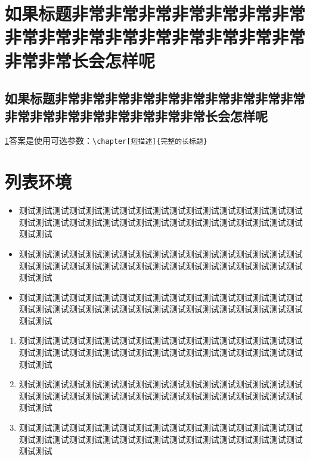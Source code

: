 \documentclass{njuthesis}
\begin{document}
\maketitle

% 


\raggedbottom

\tableofcontents
\listoffigures
\listoftables

\mainmatter

\chapter[非常长的标题不好看]{如果标题非常非常非常非常非常非常非常非常非常非常非常非常非常非常非常非常非常非常长会怎样呢}
\label{ch:longtitle}
\section[还是用短点的吧]{如果标题非常非常非常非常非常非常非常非常非常非常非常非常非常非常非常非常非常非常长会怎样呢}
\cref{ch:longtitle}答案是使用可选参数：\verb+\chapter[短描述]{完整的长标题}+

\zhlipsum[1-10][name=zhufu]

\chapter{列表环境}

\begin{itemize}
    \item 测试测试测试测试测试测试测试测试测试测试测试测试测试测试测试测试测试测试测试测试测试测试测试测试测试测试测试测试测试测试测试测试测试测试测试测试
    \item 测试测试测试测试测试测试测试测试测试测试测试测试测试测试测试测试测试测试测试测试测试测试测试测试测试测试测试测试测试测试测试测试测试测试测试测试
    \item 测试测试测试测试测试测试测试测试测试测试测试测试测试测试测试测试测试测试测试测试测试测试测试测试测试测试测试测试测试测试测试测试测试测试测试测试
\end{itemize}

\begin{enumerate}
    \item 测试测试测试测试测试测试测试测试测试测试测试测试测试测试测试测试测试测试测试测试测试测试测试测试测试测试测试测试测试测试测试测试测试测试测试测试
    \item 测试测试测试测试测试测试测试测试测试测试测试测试测试测试测试测试测试测试测试测试测试测试测试测试测试测试测试测试测试测试测试测试测试测试测试测试
    \item 测试测试测试测试测试测试测试测试测试测试测试测试测试测试测试测试测试测试测试测试测试测试测试测试测试测试测试测试测试测试测试测试测试测试测试测试
\end{enumerate}
\end{document}
